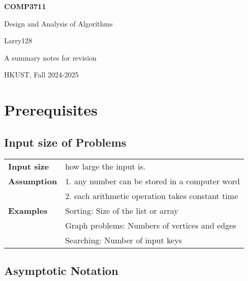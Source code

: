 \documentclass[11pt]{article}
\begin{document}
\begin{titlepage}
    \begin{center}
        \vspace*{1cm}
            
        \Huge
        \textbf{COMP3711}
            
        \vspace{0.5cm}
        \LARGE
        Design and Analysis of Algorithms
            
        \vspace{1.5cm}
            
        Larry128
            
        \vfill
            
        A summary notes for revision
            
        \vspace{0.8cm}
                
        \Large
        HKUST, Fall 2024-2025
            
    \end{center}
\end{titlepage}

\tableofcontents
\newpage


\section{Prerequisites}
\subsection{Input size of Problems}

\begin{tabular}{ll}
\textbf{Input size}& how large the input is.\\
\textbf{Assumption}& 1. any number can be stored in a computer word\\
&2. each arithmetic operation takes constant time\\
\textbf{Examples}& Sorting: Size of the list or array\\
& Graph problems: Numbers of vertices and edges\\
& Searching: Number of input keys
\end{tabular}

\subsection{Asymptotic Notation}
\end{document}
